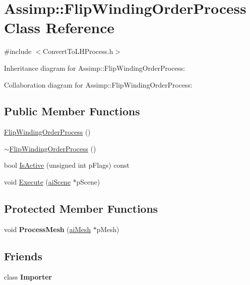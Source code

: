 \hypertarget{class_assimp_1_1_flip_winding_order_process}{\section{Assimp\+:\+:Flip\+Winding\+Order\+Process Class Reference}
\label{class_assimp_1_1_flip_winding_order_process}
}


{\ttfamily \#include $<$Convert\+To\+L\+H\+Process.\+h$>$}



Inheritance diagram for Assimp\+:\+:Flip\+Winding\+Order\+Process\+:


Collaboration diagram for Assimp\+:\+:Flip\+Winding\+Order\+Process\+:
\subsection*{Public Member Functions}
\begin{DoxyCompactItemize}
\item 
\hyperlink{class_assimp_1_1_flip_winding_order_process_a4596d23fc6a10901a1a371d8c689e6b1}{Flip\+Winding\+Order\+Process} ()
\item 
\hyperlink{class_assimp_1_1_flip_winding_order_process_ace464c6e9f297f5b00cf8ec8c2dbae13}{$\sim$\+Flip\+Winding\+Order\+Process} ()
\item 
bool \hyperlink{class_assimp_1_1_flip_winding_order_process_a9d752954dbc5e0b94f350076066e0e35}{Is\+Active} (unsigned int p\+Flags) const 
\item 
void \hyperlink{class_assimp_1_1_flip_winding_order_process_a4cd6e491c08114a66aec526e0c127ac6}{Execute} (\hyperlink{structai_scene}{ai\+Scene} $\ast$p\+Scene)
\end{DoxyCompactItemize}
\subsection*{Protected Member Functions}
\begin{DoxyCompactItemize}
\item 
\hypertarget{class_assimp_1_1_flip_winding_order_process_a4730af95ae3fa4fef8eb850f896cf38b}{void {\bfseries Process\+Mesh} (\hyperlink{structai_mesh}{ai\+Mesh} $\ast$p\+Mesh)}\label{class_assimp_1_1_flip_winding_order_process_a4730af95ae3fa4fef8eb850f896cf38b}

\end{DoxyCompactItemize}
\subsection*{Friends}
\begin{DoxyCompactItemize}
\item 
\hypertarget{class_assimp_1_1_flip_winding_order_process_ad2d8744585dcb094644b1caed04ac9ed}{class {\bfseries Importer}}\label{class_assimp_1_1_flip_winding_order_process_ad2d8744585dcb094644b1caed04ac9ed}

\end{DoxyCompactItemize}

